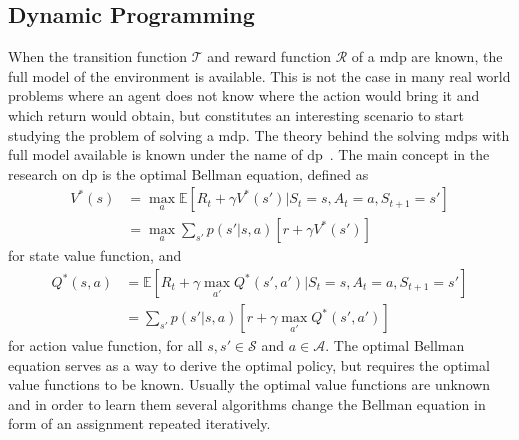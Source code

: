 \subsection{Dynamic Programming}
When the transition function $\mathcal{T}$ and reward function $\mathcal{R}$ of a \gls{mdp} are known, the full model of the environment is available. This is not the case in many real world problems where an agent does not know where the action would bring it and which return would obtain, but constitutes an interesting scenario to start studying the problem of solving a \gls{mdp}. The theory behind the solving \glspl{mdp} with full model available is known under the name of \gls{dp}~\cite{bertsekas2005dynamic, bellman2013dynamic}. The main concept in the research on \gls{dp} is the optimal Bellman equation, defined as
\begin{align}
 V^*(s) &= \max_a \mathbb{E}[R_t + \gamma V^*(s') | S_t = s, A_t = a, S_{t+1} = s']\nonumber\\
        &= \max_a \sum_{s'} p(s' | s, a)[r + \gamma V^*(s')]
\end{align}
for state value function, and
\begin{align}
 Q^*(s,a) &= \mathbb{E}[R_t + \gamma \max_{a'}Q^*(s', a') | S_t = s, A_t = a, S_{t+1} = s']\nonumber\\
          &= \sum_{s'} p(s' | s, a)[r + \gamma \max_{a'}Q^*(s', a')]
\end{align}
for action value function, for all $s, s' \in \mathcal{S}$ and $a \in \mathcal{A}$.
The optimal Bellman equation serves as a way to derive the optimal policy, but requires the optimal value functions to be known. Usually the optimal value functions are unknown and in order to learn them several algorithms change the Bellman equation in form of an assignment repeated iteratively.

